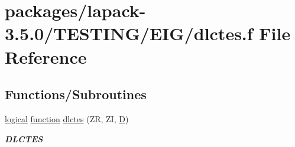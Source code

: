 \hypertarget{dlctes_8f}{}\section{packages/lapack-\/3.5.0/\+T\+E\+S\+T\+I\+N\+G/\+E\+I\+G/dlctes.f File Reference}
\label{dlctes_8f}
\subsection*{Functions/\+Subroutines}
\begin{DoxyCompactItemize}
\item 
\hyperlink{tnc_8c_aa7b64cdf39500931f7b333343791a104}{logical} \hyperlink{afunc_8m_a7b5e596df91eadea6c537c0825e894a7}{function} \hyperlink{group__double__eig_ga9773e3d39987ec10a5a58e224ff7582b}{dlctes} (Z\+R, Z\+I, \hyperlink{odrpack_8h_a7dae6ea403d00f3687f24a874e67d139}{D})
\begin{DoxyCompactList}\small\item\em {\bfseries D\+L\+C\+T\+E\+S} \end{DoxyCompactList}\end{DoxyCompactItemize}
